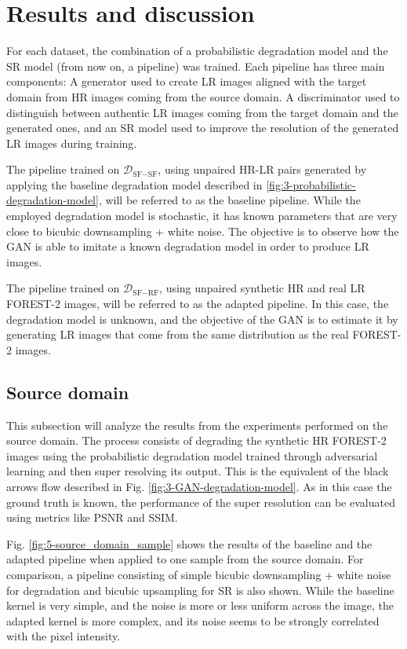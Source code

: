 
\section{Results and discussion}
\label{sec:results}


For each dataset, the combination of a probabilistic degradation model and the SR model (from now on, a pipeline) was trained. 
Each pipeline has three main components: A generator used to create LR images aligned with the target domain from HR images coming from the source domain. A discriminator used to distinguish between authentic LR images coming from the target domain and the generated ones, and an SR model used to improve the resolution of the generated LR images during training.


The pipeline trained on $\mathcal{D}_{\text{SF}-\text{SF}}$, using unpaired HR-LR pairs generated by applying the baseline degradation model described in \ref{fig:3-probabilistic-degradation-model}, will be referred to as the baseline pipeline.
While the employed degradation model is stochastic, it has known parameters that are very close to bicubic downsampling + white noise. The objective is to observe how the GAN is able to imitate a known degradation model in order to produce LR images.

The pipeline trained on $\mathcal{D}_{\text{SF}-\text{RF}}$, using unpaired synthetic HR and real LR FOREST-2 images, will be referred to as the adapted pipeline.
In this case, the degradation model is unknown, and the objective of the GAN is to estimate it by generating LR images that come from the same distribution as the real FOREST-2 images.

    \subsection{Source domain}

        This subsection will analyze the results from the experiments performed on the source domain.
        The process consists of degrading the synthetic HR FOREST-2 images using the probabilistic degradation model trained through adversarial learning and then super resolving its output.
        This is the equivalent of the black arrows flow described in Fig. \ref{fig:3-GAN-degradation-model}. 
        As in this case the ground truth is known, the performance of the super resolution can be evaluated using metrics like PSNR and SSIM. 

        Fig. \ref{fig:5-source_domain_sample} shows the results of the baseline and the adapted pipeline when applied to one sample from the source domain. For comparison, a pipeline consisting of simple bicubic downsampling + white noise for degradation and bicubic upsampling for SR is also shown. 
        While the baseline kernel is very simple, and the noise is more or less uniform across the image, the adapted kernel is more complex, and its noise seems to be strongly correlated with the pixel intensity.

